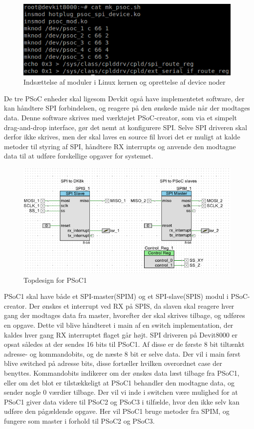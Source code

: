 \begin{figure}[H]
\includegraphics{Screenshots/Devkit_cat_mk_psoc}
\caption{Indsættelse af moduler i Linux kernen og oprettelse af device noder}
\end{figure}

De tre PSoC enheder skal ligesom Devkit også have implementetet software, der kan håndtere SPI forbindelsen, og reagere
på den ønskede måde når der modtages data. Denne software skrives med værktøjet PSoC-creator, som via et simpelt drag-and-drop interface, gør det
nemt at konfigurere SPI. Selve SPI driveren skal derfor ikke skrives, men der skal laves en source fil hvori det er muligt at kalde metoder til
styring af SPI, håndtere RX interrupts og anvende den modtagne data til at udføre forskellige opgaver for systemet.

\begin{figure}[H]
\includegraphics{Screenshots/PSOC_opstilling_spi}
\caption{Topdesign for PSoC1}
\end{figure}

PSoC1 skal have både et SPI-master(SPIM) og et SPI-slave(SPIS) modul i PSoC-creator. Der ønskes et interrupt ved RX på SPIS, da slaven skal reagere
hver gang der modtages data fra master, hvorefter der skal skrives tilbage, og udføres en opgave. Dette vil blive håndteret i main af en switch 
implementation, der kaldes hver gang RX interruptet flaget går højt. SPI driveren på Devit8000 er opsat således at der sendes 16 bits til PSoC1.
Af disse er de første 8 bit tiltænkt adresse- og kommandobits, og de næste 8 bit er selve data. Der vil i main først blive switched på adresse bits,
disse fortæller hvilken overordnet case der benyttes. Kommandobits indikerer om der ønskes data læst tilbage fra PSoC1, eller om det blot er 
tilstækkeligt at PSoC1 behandler den modtagne data, og sender nogle 0 værdier tilbage. Der vil vi inde i switchen være mulighed for at PSoC1 giver 
data videre til PSoC2 og PSoC3 i tilfælde, hvor den ikke selv kan udføre den pågældende opgave. Her vil PSoC1 bruge metoder fra SPIM, og fungere som master 
i forhold til PSoC2 og PSoC3. 

